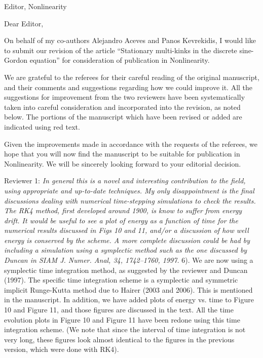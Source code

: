 \documentclass[11pt]{letter}
\begin{document}
\address{Ross Parker \\
Department of Mathematics \\
Southern Methodist University \\
Dallas, TX 75275 \\
\texttt{rhparker@smu.edu}}%
\signature{Ross Parker}
\begin{letter}{Editor, Nonlinearity}

\opening{Dear Editor,}

On behalf of my co-authors Alejandro Aceves and Panos Kevrekidis, I would like to submit our revision of the article ``Stationary multi-kinks in the discrete sine-Gordon equation'' for consideration of publication in Nonlinearity. 

We are grateful to the referees for their careful reading of the original manuscript, and their comments and suggestions regarding how we could improve it. All the suggestions for improvement from the two reviewers have been systematically taken into careful consideration and incorporated into the revision, as noted below. The portions of the manuscript which have been revised or added are indicated using red text. 

Given the improvements made in accordance with the requests of the referees, we hope that you will now find the manuscript to be suitable for publication in Nonlinearity. We will be sincerely looking forward to your editorial decision.

Reviewer 1: \emph{In general this is a novel and interesting contribution to the field, using appropriate and up-to-date techniques. My only disappointment is the final discussions dealing with numerical time-stepping simulations to check the results.  The RK4 method, first developed around 1900, is know to suffer from energy drift.  It would be useful to see a plot of energy as a function of time for the numerical results discussed in Figs 10 and 11, and/or a discussion of how well energy is conserved by the scheme.  A more complete discussion could be had by including a simulation using a symplectic method such as the one discussed by Duncan in SIAM J. Numer. Anal, 34, 1742–1760, 1997.} 6). We are now using a symplectic time integration method, as suggested by the reviewer and Duncan (1997). The specific time integration scheme is a symplectic and symmetric implicit Runge-Kutta method due to Hairer (2003 and 2006). This is mentioned in the manuscript. In addition, we have added plots of energy vs. time to Figure 10 and Figure 11, and those figures are discussed in the text. All the time evolution plots in Figure 10 and Figure 11 have been redone using this time integration scheme. (We note that since the interval of time integration is not very long, these figures look almost identical to the figures in the previous version, which were done with RK4).


\end{letter}
\end{document}
